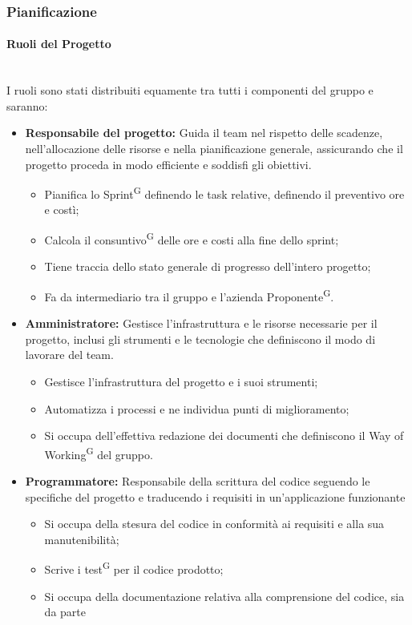 \documentclass[8pt]{article}
\newcommand{\glossterm}[1]{#1\textsuperscript{G}} %
\newcommand{\subsubsubsection}[1]{\paragraph{#1}\mbox{}\\}
\begin{document}
\subsubsection{Pianificazione} \label{sec:pianificazione}

\subsubsubsection{Ruoli del Progetto}
I ruoli sono stati distribuiti equamente tra tutti i componenti del gruppo e saranno:
\begin{itemize}
	\item \textbf{Responsabile del progetto:} Guida il team nel rispetto delle scadenze, nell'allocazione delle risorse e nella pianificazione generale, assicurando che il progetto proceda in modo efficiente e soddisfi gli obiettivi.
	\begin{itemize}
    \item Pianifica lo \glossterm{Sprint} definendo le task relative, definendo il preventivo ore e
        costì;
    \item Calcola il \glossterm{consuntivo} delle ore e costi alla fine dello sprint;
    \item Tiene traccia dello stato generale di progresso dell'intero progetto;
    \item Fa da intermediario tra il gruppo e l'azienda \glossterm{Proponente}.
  \end{itemize}
	\item \textbf{Amministratore:} Gestisce l'infrastruttura e le risorse necessarie per il progetto, inclusi gli strumenti e le tecnologie che definiscono il modo di lavorare del team.
	\begin{itemize}
    \item Gestisce l'infrastruttura del progetto e i suoi strumenti;
    \item Automatizza i processi e ne individua punti di miglioramento;
    \item Si occupa dell'effettiva redazione dei documenti che definiscono il \glossterm{Way of
        Working} del gruppo.
	\end{itemize}
  \item \textbf{Programmatore:} Responsabile della scrittura del codice seguendo le specifiche del progetto e traducendo i requisiti in un'applicazione funzionante
	\begin{itemize}
    \item Si occupa della stesura del codice in conformità ai requisiti e alla sua manutenibilità;
    \item Scrive i \glossterm{test} per il codice prodotto;
    \item Si occupa della documentazione relativa alla comprensione del codice, sia da parte

\end{itemize}
\end{itemize}
\end{document}
